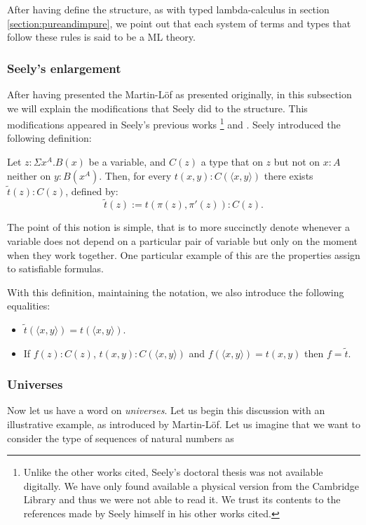 \begin{remark}
  After having define the structure, as with typed lambda-calculus in section \ref{section:pureandimpure}, we point out that each system of terms and types that follow these rules is said to be a ML theory. 
\end{remark}
\subsubsection{Seely's enlargement}

After having presented the Martin-L\"of as presented originally, in this subsection we will explain the modifications that Seely did to the structure. This modifications appeared in Seely's previous works \cite{seely1977hyperdoctrines}\footnote{Unlike the other works cited, Seely's doctoral thesis was not available digitally. We have only found available a physical version from the Cambridge Library and thus we were not able to read it. We trust its contents to the references made by Seely himself in his other works cited.} and \cite{seely1983hyperdoctrines}. Seely introduced the following definition:

\begin{definition}
  Let $z : \Sigma x^A.B(x)$ be a variable, and $C(z)$ a type that on $z$ but not on $x:A$ neither on $y:B(x^A)$. Then, for every $t(x,y) : C(\langle x, y\rangle)$ there exists $\tilde t (z) : C(z)$, defined by:
  $$\tilde t (z) := t(\pi(z),\pi'(z)): C(z).$$
\end{definition}

The point of this notion is simple, that is to more succinctly denote whenever a variable does not depend on a particular pair of variable but only on the moment when they work together. One particular example of this are the properties assign to satisfiable formulas.

With this definition, maintaining the notation, we also introduce the following equalities:
\begin{itemize}
\item $\tilde t(\langle x,y\rangle) = t(\langle x,y\rangle) $.
\item If $f(z): C(z)$, $t(x,y):C(\langle x,y\rangle)$ and $f(\langle x,y\rangle) = t(x,y)$ then $f=\tilde t$.

\end{itemize}


\subsubsection{Universes}
Now let us have a word on \emph{universes}. Let us begin this discussion with an illustrative example, as introduced by Martin-Löf. Let us imagine that we want to consider the type of sequences of natural numbers as 

